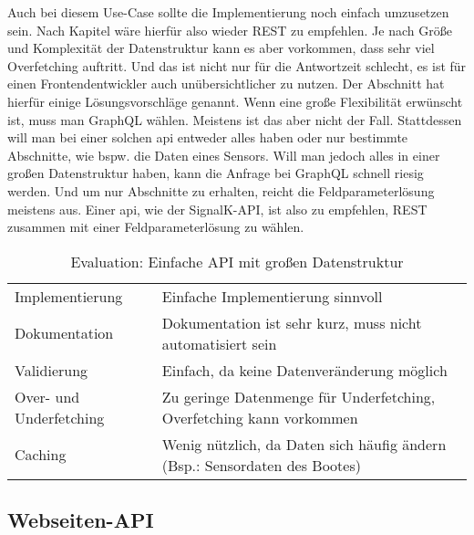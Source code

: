 Auch bei diesem Use-Case sollte die Implementierung noch einfach umzusetzen sein. Nach Kapitel  wäre hierfür also wieder \ac{REST} zu empfehlen. Je nach Größe und Komplexität der Datenstruktur kann es aber vorkommen, dass sehr viel Overfetching auftritt. Und das ist nicht nur für die Antwortzeit schlecht, es ist für einen Frontendentwickler auch unübersichtlicher zu nutzen. Der Abschnitt  hat hierfür einige Lösungsvorschläge genannt. Wenn eine große Flexibilität erwünscht ist, muss man GraphQL wählen. Meistens ist das aber nicht der Fall. Stattdessen will man bei einer solchen \ac{api} entweder alles haben oder nur bestimmte Abschnitte, wie bspw. die Daten eines Sensors. Will man jedoch alles in einer großen Datenstruktur haben, kann die Anfrage bei GraphQL schnell riesig werden. Und um nur Abschnitte zu erhalten, reicht die Feldparameterlösung meistens aus. Einer \ac{api}, wie der SignalK-API, ist also zu empfehlen, \ac{REST} zusammen mit einer Feldparameterlösung zu wählen.

\begin{table}[H]
\begin{tabular}{p{4cm} p{10cm}}
Implementierung & Einfache Implementierung sinnvoll \\
Dokumentation & Dokumentation ist sehr kurz, muss nicht automatisiert sein \\
Validierung & Einfach, da keine Datenveränderung möglich \\
Over- und Underfetching & Zu geringe Datenmenge für Underfetching, Overfetching kann vorkommen \\
Caching & Wenig nützlich, da Daten sich häufig ändern (Bsp.: Sensordaten des Bootes)
\end{tabular}
\caption{Evaluation: Einfache API mit großen Datenstruktur}
\end{table}

\subsection{Webseiten-API}

